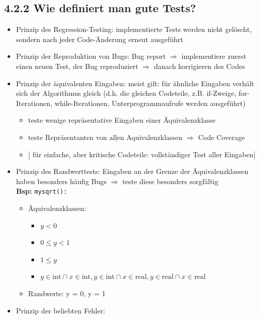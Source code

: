 \documentclass[11pt, fleqn]{scrreprt}
\begin{document}
\subsection*{4.2.2 Wie definiert man gute Tests?}
\begin{itemize}
	\item Prinzip des Regression-Testing: implementierte Tests werden nicht gelöscht, sondern nach jeder Code-Änderung erneut ausgeführt
	\item Prinzip der Reproduktion von Bugs: Bug report $\Rightarrow$ implementiere zuerst einen neuen Test, der Bug reproduziert $\Rightarrow$ danach korrigieren des Codes
	\item Prinzip der äquivalenten Eingaben: meist gilt: für ähnliche Eingaben verhält sich der Algorithmus gleich (d.h. die gleichen Codeteile, z.B. if-Zweige, for-Iterationen, while-Iterationen, Unterprogrammaufrufe werden ausgeführt)
	\begin{itemize}[label={$\Rightarrow$}]
		\item teste wenige repräsentative Eingaben einer Äquivalenzklasse
		\item teste Repräsentanten von $\underline{\text{allen}}$ Aquivalenzklassen $\Rightarrow$ Code Coverage
		\item[] $\lbrack$ für einfache, aber kritische Codeteile: vollständiger Test aller Eingaben$\rbrack$
	\end{itemize}
	\item Prinzip des Randwerttests: Eingaben an der Grenze der Äquivalenzklassen haben besonders häufig Bugs $\Rightarrow$ teste diese besonders sorgfältig \\
	\textbf{Bsp:} \verb|mysqrt(): |
	\begin{itemize}
		\item Äquivalenzklassen: 
		\begin{itemize}
			\item $y < 0$
			\item $0 \leq y < 1$
			\item $1 \leq y$
			\item $y \in \text{int} \cap x \in \text{int}, y \in \text{int} \cap x \in \text{real}, y \in \text{real}\cap x \in \text{real}$
			\end{itemize}
			\item Randwerte: y = 0, y = 1 
			\end{itemize}
			\item Prinzip der \glqq beliebten Fehler\grqq:

\end{itemize}
\end{document}
